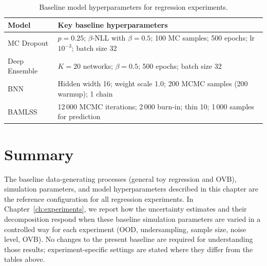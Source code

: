 \begin{table}[htbp]
  \centering
  \caption{Baseline model hyperparameters for regression experiments.}
  \label{tab:baseline-model-params}
  \begin{tabular}{ll}
    \toprule
    Model & Key baseline hyperparameters \\
    \midrule
    MC Dropout & \(p = 0.25\); \(\beta\)-NLL with \(\beta = 0.5\); 100 MC samples; 500 epochs; lr \(10^{-3}\); batch size 32 \\
    Deep Ensemble & \(K = 20\) networks; \(\beta = 0.5\); 500 epochs; batch size 32 \\
    BNN & Hidden width 16; weight scale 1.0; 200 MCMC samples (200 warmup); 1 chain \\
    BAMLSS & 12\,000 MCMC iterations; 2\,000 burn-in; thin 10; 1\,000 samples for prediction \\
    \bottomrule
  \end{tabular}
\end{table}

\section{Summary}
\label{sec:experimental-setup-summary}

The baseline data-generating processes (general toy regression and OVB), simulation parameters, and model hyperparameters described in this chapter are the reference configuration for all regression experiments. In Chapter~\ref{ch:experiments}, we report how the uncertainty estimates and their decomposition respond when these baseline simulation parameters are varied in a controlled way for each experiment (OOD, undersampling, sample size, noise level, OVB). No changes to the present baseline are required for understanding those results; experiment-specific settings are stated where they differ from the tables above.
